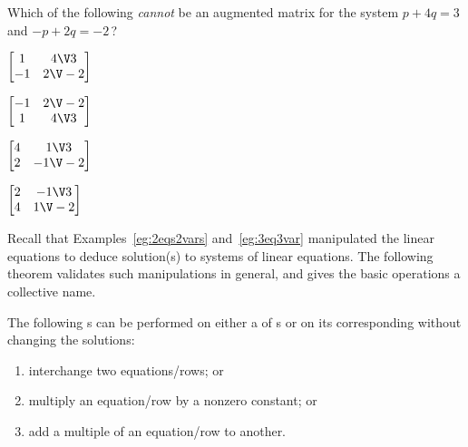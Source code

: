 \begin{activity}
Which of the following \emph{cannot} be an augmented matrix for the system \(p+4q=3\) and \(-p+2q=-2\)\,?
\begin{parts}
\item \(\begin{bmatrix} 1&4\V3\\-1&2\V-2 \end{bmatrix}\)
\item \(\begin{bmatrix} -1&2\V-2\\1&4\V3 \end{bmatrix}\)
\item \(\begin{bmatrix} 4&1\V3\\2&-1\V-2 \end{bmatrix}\)
\item \(\begin{bmatrix} 2&-1\V3\\4&1\V-2 \end{bmatrix}\)%
\end{parts}
\end{activity}





Recall that Examples~\ref{eg:2eqs2vars} and~\ref{eg:3eq3var} manipulated the linear equations to deduce solution(s) to systems of linear equations.
The following theorem validates such manipulations in general, and gives the basic operations a collective name. 


\begin{theorem} \label{thm:erowop} 
The following s can be performed on either a  of s or on its corresponding  without changing the solutions:
\begin{enumerate}
\item {}interchange two equations\slash rows; or
\item multiply an equation\slash row by a nonzero constant; or
\item add a multiple of an equation\slash row to another.
\end{enumerate}
\end{theorem}

\begin{comment}
Interestingly, some other texts omit a proof that row operations preserve the solution(s).  Poole comments on reversibility.  Larson comments that row operations produce `equivalent' systems, but does not prove.  
\end{comment}


